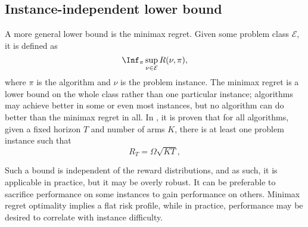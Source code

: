 \subsection{Instance-independent lower bound}
A more general lower bound is the minimax regret.
Given some problem class $\mathcal{E}$, it is defined as
\begin{equation}
    \Inf_{\pi} \sup_{\nu \in \mathcal{E}} R(\nu, \pi),
\end{equation}
where $\pi$ is the algorithm and $\nu$ is the problem instance.
The minimax regret is a lower bound on the whole class rather than one particular instance; algorithms may achieve better in some or even most instances, but no algorithm can do better than the minimax regret in all.
In \cite{auer2002a}, it is proven that for all algorithms, given a fixed horizon $T$ and number of arms $K$, there is at least one problem instance such that
\begin{equation}
    R_T = \Omega\sqrt{KT},
\end{equation}

Such a bound is independent of the reward distributions, and as such, it is applicable in practice, but it may be overly robust.
It can be preferable to sacrifice performance on some instances to gain performance on others.
Minimax regret optimality implies a flat risk profile, while in practice, performance may be desired to correlate with instance difficulty.